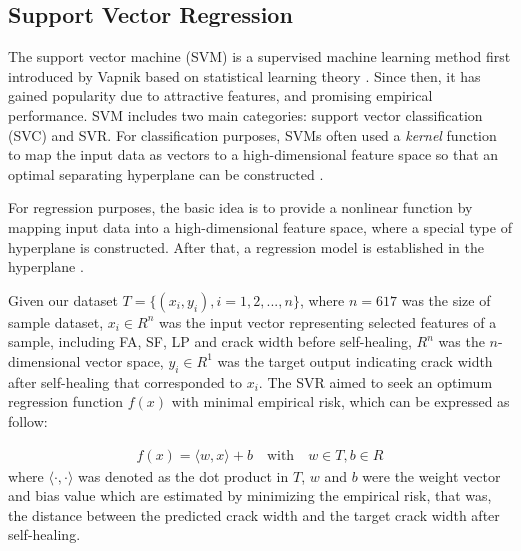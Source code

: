 \documentclass[11pt]{article}
\begin{document}
	\subsection{Support Vector Regression}
	
	The support vector machine (SVM) is a supervised machine learning method first introduced by Vapnik \cite{cortes1995support,vapnik1999overview} based on statistical learning theory \cite{juncai2015prediction}. Since then, it has gained popularity due to attractive features, and promising empirical performance. SVM includes two main categories: support vector classification (SVC) and SVR. For classification purposes, SVMs often used a \textit{kernel} function to map the input data as vectors to a high-dimensional feature space so that an optimal separating hyperplane can be constructed \cite{suykens1999least}. 
	
	For regression purposes, the basic idea is to provide a nonlinear function by mapping input data into a high-dimensional feature space, where a special type of hyperplane is constructed. After that, a regression model is established in the hyperplane \cite{li2007consensus}. 
	
	Given our dataset $T = \{ (x_i,y_i), i = 1,2,...,n\}$, where $n = 617$ was the size of sample dataset, $x_i \in R^n$ was the input vector representing selected features of a sample, including FA, SF, LP and crack width before self-healing, $R^n$ was the $n$-dimensional vector space, $y_i \in R^1$ was the target output indicating crack width after self-healing that corresponded to $x_i$. The SVR aimed to seek an optimum regression function $f(x)$ with minimal empirical risk, which can be expressed as follow:
	
	\begin{eqnarray}
	f(x) = \langle w,x \rangle + b \quad \text{with} \quad w \in T, b \in R                                                              
	\end{eqnarray}
	where $\langle \cdot, \cdot \rangle$ was denoted as the dot product in $T$, $w$ and $b$ were the weight vector and bias value which are estimated by minimizing the empirical risk, that was, the distance between the predicted crack width and the target crack width after self-healing.  
	
\end{document}

